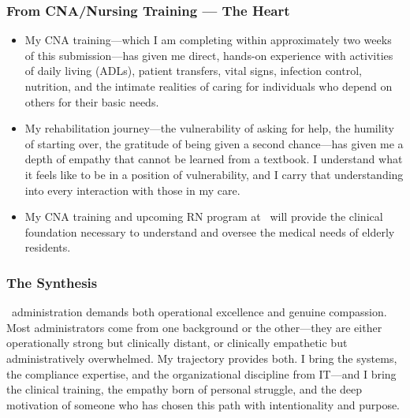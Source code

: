 \subsubsection{From CNA/Nursing Training --- The Heart}
\begin{itemize}[leftmargin=2em, itemsep=0.2em]
  \item {} My CNA training---which I am completing within approximately two weeks of this submission---has given me direct, hands-on experience with activities of daily living (ADLs), patient transfers, vital signs, infection control, nutrition, and the intimate realities of caring for individuals who depend on others for their basic needs.
  \item {} My rehabilitation journey---the vulnerability of asking for help, the humility of starting over, the gratitude of being given a second chance---has given me a depth of empathy that cannot be learned from a textbook. I understand what it feels like to be in a position of vulnerability, and I carry that understanding into every interaction with those in my care.
  \item {} My CNA training and upcoming RN program at \NursingSchool\ will provide the clinical foundation necessary to understand and oversee the medical needs of elderly residents.
\end{itemize}

\subsubsection{The Synthesis}

\FacilityTypeShort\ administration demands both operational excellence and genuine compassion. Most administrators come from one background or the other---they are either operationally strong but clinically distant, or clinically empathetic but administratively overwhelmed. My trajectory provides both. I bring the systems, the compliance expertise, and the organizational discipline from IT---and I bring the clinical training, the empathy born of personal struggle, and the deep motivation of someone who has chosen this path with intentionality and purpose.
